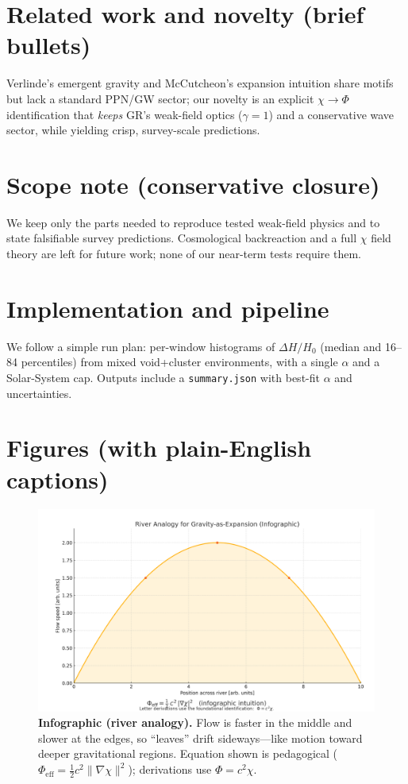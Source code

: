 \documentclass[11pt]{article}
\begin{document}
\section*{Related work and novelty (brief bullets)}
Verlinde’s emergent gravity and McCutcheon’s expansion intuition share motifs but lack a standard PPN/GW sector; our novelty is an explicit $\chi\!\to\!\Phi$ identification that \emph{keeps} GR’s weak-field optics ($\gamma=1$) and a conservative wave sector, while yielding crisp, survey-scale predictions.

\section*{Scope note (conservative closure)}
We keep only the parts needed to reproduce tested weak-field physics and to state falsifiable survey predictions. Cosmological backreaction and a full $\chi$ field theory are left for future work; none of our near-term tests require them.

\section*{Implementation and pipeline}
We follow a simple run plan: per-window histograms of $\Delta H/H_0$ (median and 16–84 percentiles) from mixed void+cluster environments, with a single $\alpha$ and a Solar-System cap. Outputs include a \texttt{summary.json} with best-fit $\alpha$ and uncertainties.

\section*{Figures (with plain-English captions)}
\begin{figure}[h]\centering
\includegraphics[width=0.92\linewidth]{expansion_gravity_infographic_v3_7.png}
\caption{\textbf{Infographic (river analogy).} Flow is faster in the middle and slower at the edges, so “leaves” drift sideways—like motion toward deeper gravitational regions. Equation shown is pedagogical ($\Phi_{\mathrm{eff}}=\frac{1}{2} c^{2}\|\nabla\chi\|^{2}$); derivations use $\Phi=c^{2}\chi$.}
\end{figure}
\end{document}
